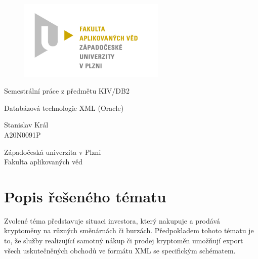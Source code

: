 \documentclass[12pt, a4paper]{article}
\let\oldsection\section
\renewcommand\section{\clearpage\oldsection}
\begin{document}
	\renewcommand{\lstlistingname}{Ukázka kódu}
	\renewcommand{\lstlistlistingname}{Seznam ukázek kódu}
    \begin{titlepage}

        \centering

        \vspace*{\baselineskip}
        \begin{figure}[H]
        \centering
        \includegraphics[width=7cm]{img/fav-logo.jpg}
        \end{figure}

        \vspace*{1\baselineskip}

        \vspace{0.75\baselineskip}

        \vspace{0.5\baselineskip}
        {Semestrální práce z předmětu KIV/DB2}

        {\LARGE\sc Databázová technologie XML (Oracle)\\}

        \vspace{4\baselineskip}

        \vspace{0.5\baselineskip}

        {\sc\Large Stanislav Král \\}
        \vspace{0.5\baselineskip}
        {A20N0091P}

        \vfill

        {\sc Západočeská univerzita v Plzni\\
        Fakulta aplikovaných věd}

    \end{titlepage}


    \tableofcontents
    \pagebreak

    
\section{Popis řešeného tématu}
Zvolené téma představuje situaci investora, který nakupuje a prodává kryptoměny na různých směnárnách či burzách. Předpokladem tohoto tématu je to, že služby realizující samotný nákup či prodej kryptoměn umožňují export všech uskutečněných obchodů ve formátu XML se specifickým schématem. 
\end{document}
